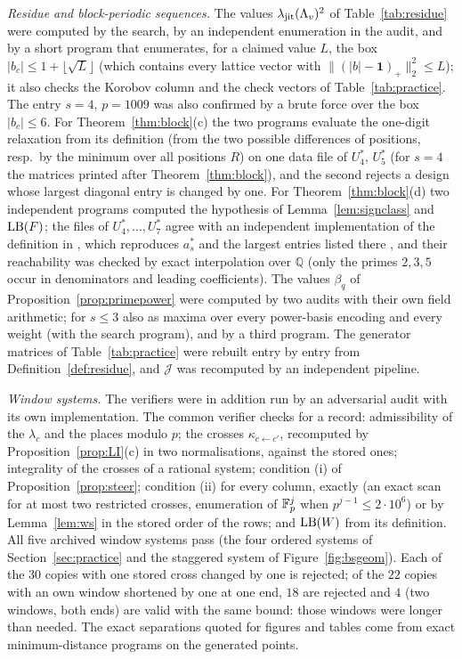 \emph{Residue and block-periodic sequences.} The values $\lambda_{\mathrm{jit}}(\Lambda_v)^2$ of Table~\ref{tab:residue} were computed by the search, by an independent enumeration in the audit, and by a short program that enumerates, for a claimed value $L$, the box $|b_c|\le1+\lfloor\sqrt L\rfloor$ (which contains every lattice vector with $\|(|b|-\mathbf 1)_+\|_2^2\le L$); it also checks the Korobov column and the check vectors of Table~\ref{tab:practice}. The entry $s=4$, $p=1009$ was also confirmed by a brute force over the box $|b_c|\le6$. For Theorem~\ref{thm:block}(c) the two programs evaluate the one-digit relaxation from its definition (from the two possible differences of positions, resp.\ by the minimum over all positions $R$) on one data file of $U^*_4$, $U^*_5$ (for $s=4$ the matrices printed after Theorem~\ref{thm:block}), and the second rejects a design whose largest diagonal entry is changed by one. For Theorem~\ref{thm:block}(d) two independent programs computed the hypothesis of Lemma~\ref{lem:signclass} and $\mathrm{LB}(F)$; the files of $U^*_4,\dots,U^*_7$ agree with an independent implementation of the definition in \cite{Gru26geo}, which reproduces $a^*_s$ and the largest entries listed there%
, and their reachability was checked by exact interpolation over $\mathbb Q$ (only the primes $2,3,5$ occur in denominators and leading coefficients). The values $\beta_q$ of Proposition~\ref{prop:primepower} were computed by two audits with their own field arithmetic; for $s\le3$ also as maxima over every power-basis encoding and every weight (with the search program), and by a third program. The generator matrices of Table~\ref{tab:practice} were rebuilt entry by entry from Definition~\ref{def:residue}, and $\mathcal J$ was recomputed by an independent pipeline.

\emph{Window systems.} The verifiers were in addition run by an adversarial audit with its own implementation. The common verifier checks for a record: admissibility of the $\lambda_c$ and the places modulo $p$; the crosses $\kappa_{c\leftarrow c'}$, recomputed by Proposition~\ref{prop:LI}(c) in two normalisations, against the stored ones; integrality of the crosses of a rational system; condition (i) of Proposition~\ref{prop:steer}; condition (ii) for every column, exactly (an exact scan for at most two restricted crosses, enumeration of $\mathbb{F}_p^j$ when $p^{j-1}\le2\cdot10^6$) or by Lemma~\ref{lem:ws} in the stored order of the rows; and $\mathrm{LB}(W)$ from its definition. All five archived window systems pass (the four ordered systems of Section~\ref{sec:practice} and the staggered system of Figure~\ref{fig:bsgeom}). Each of the $30$ copies with one stored cross changed by one is rejected; of the $22$ copies with an own window shortened by one at one end, $18$ are rejected and $4$ (two windows, both ends) are valid with the same bound: those windows were longer than needed. The exact separations quoted for figures and tables come from exact minimum-distance programs on the generated points.

